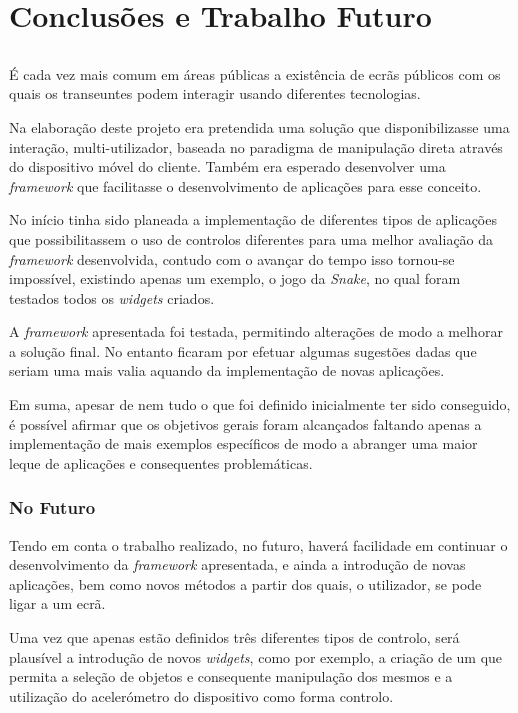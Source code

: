 \chapter{Conclusões e Trabalho Futuro} \label{chap:concl}

\section*{}

É cada vez mais comum em áreas públicas a existência de ecrãs públicos com os quais os transeuntes podem interagir usando diferentes tecnologias.

Na elaboração deste projeto era pretendida uma solução que disponibilizasse uma interação, multi-utilizador, baseada no paradigma de manipulação direta através do dispositivo móvel do cliente. Também era esperado desenvolver uma \textit{framework} que facilitasse o desenvolvimento de aplicações para esse conceito.

No início tinha sido planeada a implementação de diferentes tipos de aplicações que possibilitassem o uso de controlos diferentes para uma melhor avaliação da \textit{framework} desenvolvida, contudo com o avançar do tempo isso tornou-se impossível, existindo apenas um exemplo, o jogo da \textit{Snake}, no qual foram testados todos os \textit{widgets} criados. 

A \textit{framework} apresentada foi testada, permitindo alterações de modo a melhorar a solução final. No entanto ficaram por efetuar algumas sugestões dadas que seriam uma mais valia aquando da implementação de novas aplicações.

Em suma, apesar de nem tudo o que foi definido inicialmente ter sido conseguido, é possível afirmar que os objetivos gerais foram alcançados faltando apenas a implementação de mais exemplos específicos de modo a abranger uma maior leque de aplicações e consequentes problemáticas.

\subsection*{No Futuro}

Tendo em conta o trabalho realizado, no futuro, haverá facilidade em continuar o desenvolvimento da \textit{framework} apresentada, e ainda a introdução de novas aplicações, bem como novos métodos a partir dos quais, o utilizador, se pode ligar a um ecrã.

Uma vez que apenas estão definidos três diferentes tipos de controlo, será plausível a introdução de novos \textit{widgets}, como por exemplo, a criação de um que permita a seleção de objetos e consequente manipulação dos mesmos e a utilização do acelerómetro do dispositivo como forma controlo.

